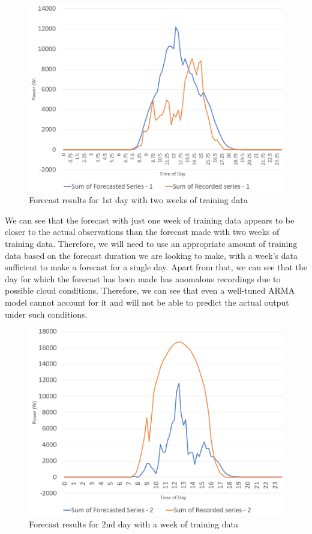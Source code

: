 \documentclass[journal]{IEEEtran}
\begin{document}
\begin{figure}[htpb]
	\centering
	\includegraphics[scale=0.35]{ForecastResultsTwoWeek.png}
	\caption{Forecast results for 1st day with two weeks of training data}
	\label{fig6} %
\end{figure}



We can see that the forecast with just one week of training data appears to be closer to the actual observations than the forecast made with two weeks of training data. Therefore, we will need to use an appropriate amount of training data based on the forecast duration we are looking to make, with a week's data sufficient to make a forecast for a single day.
Apart from that, we can see that the day for which the forecast has been made has anomalous recordings due to possible cloud conditions. Therefore, we can see that even a well-tuned ARMA model cannot account for it and will not be able to predict the actual output under such conditions.

\begin{figure}[htpb]
	\centering
	\includegraphics[scale=0.35]{ForecastOneWeekDayTwo.png}
	\caption{Forecast results for 2nd day with a week of training data}
	\label{fig7} %
\end{figure}
\end{document}
